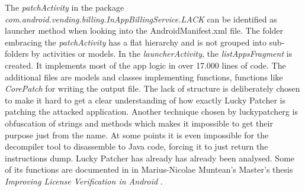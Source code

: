 The \textit{patchActivity} in the package \textit{com.android.vending.billing.InAppBillingService.LACK} can be identified as launcher method when looking into the AndroidManifest.xml file.
The folder embracing the \textit{patchActivity} has a flat hierarchy and is not grouped into sub-folders by activities or models.
In the \textit{launcherActivity}, the \textit{listAppsFragment} is created.
It implements most of the app logic in over 17.000 lines of code.
The additional files are models and classes implementing functions, functions like \textit{CorePatch} for writing the output file.
The lack of structure is deliberately chosen to make it hard to get a clear understanding of how exactly Lucky Patcher is patching the attacked application.
Another technique chosen by \gls{luckypatcherg} is obfuscation of strings and methods which makes it impossible to get their purpose just from the name.
At some points it is even impossible for the decompiler tool to disassemble to Java code, forcing it to just return the instructions dump.
\newline
Lucky Patcher has already has already been analysed.
Some of its functions are documented in in Marius-Nicolae Muntean's Master's thesis \textit{Improving License Verification in Android} \cite{munteanLicense}.
